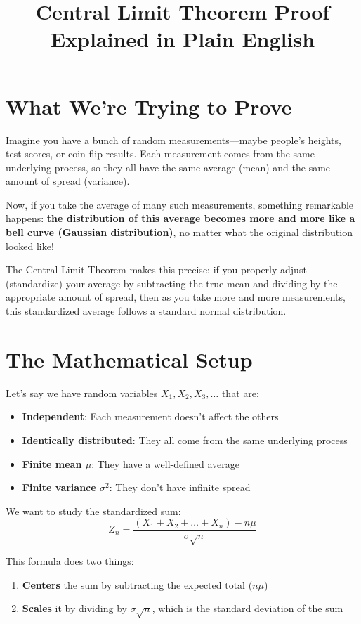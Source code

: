 \documentclass[12pt]{article}
\title{Central Limit Theorem Proof Explained in Plain English}
\author{}
\date{}
\begin{document}
\maketitle
\Large

\section*{What We're Trying to Prove}

Imagine you have a bunch of random measurements---maybe people's heights, test scores, or coin flip results. Each measurement comes from the same underlying process, so they all have the same average (mean) and the same amount of spread (variance).

Now, if you take the average of many such measurements, something remarkable happens: \textbf{the distribution of this average becomes more and more like a bell curve (Gaussian distribution)}, no matter what the original distribution looked like!

The Central Limit Theorem makes this precise: if you properly adjust (standardize) your average by subtracting the true mean and dividing by the appropriate amount of spread, then as you take more and more measurements, this standardized average follows a standard normal distribution.

\section*{The Mathematical Setup}

Let's say we have random variables $X_1, X_2, X_3, \dots$ that are:
\begin{itemize}
\item \textbf{Independent}: Each measurement doesn't affect the others
    \item \textbf{Identically distributed}: They all come from the same underlying process
    \item \textbf{Finite mean $\mu$}: They have a well-defined average
    \item \textbf{Finite variance $\sigma^2$}: They don't have infinite spread
\end{itemize}
We want to study the standardized sum:
\[
Z_n = \frac{(X_1 + X_2 + \dots + X_n) - n\mu}{\sigma\sqrt{n}}
\]

This formula does two things:
\begin{enumerate}
    \item \textbf{Centers} the sum by subtracting the expected total ($n\mu$)
    \item \textbf{Scales} it by dividing by $\sigma\sqrt{n}$, which is the standard deviation of the sum
\end{enumerate}
\end{document}
